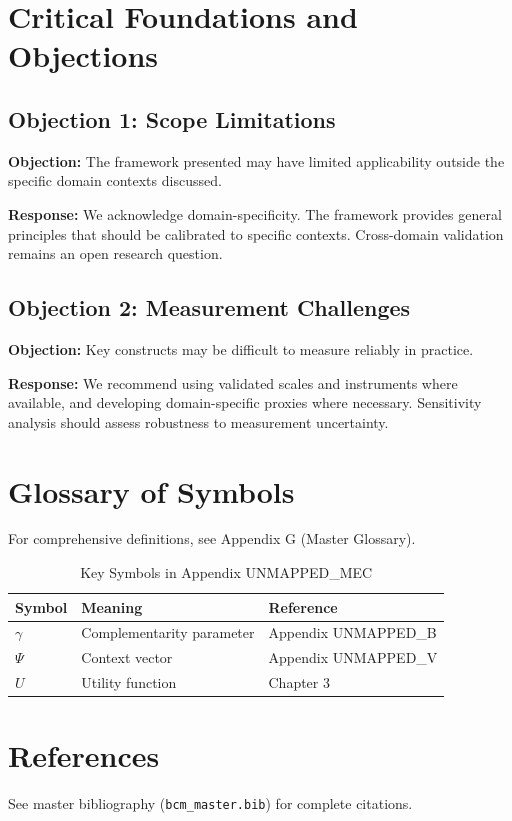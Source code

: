 
\section{Critical Foundations and Objections}
\label{sec:mec-foundations}

\subsection{Objection 1: Scope Limitations}

\textbf{Objection:} The framework presented may have limited applicability
outside the specific domain contexts discussed.

\textbf{Response:} We acknowledge domain-specificity. The framework provides
general principles that should be calibrated to specific contexts. Cross-domain
validation remains an open research question.

\subsection{Objection 2: Measurement Challenges}

\textbf{Objection:} Key constructs may be difficult to measure reliably in
practice.

\textbf{Response:} We recommend using validated scales and instruments where
available, and developing domain-specific proxies where necessary. Sensitivity
analysis should assess robustness to measurement uncertainty.



\section{Glossary of Symbols}
\label{sec:mec-glossary}

For comprehensive definitions, see Appendix G (Master Glossary).

\begin{table}[htbp]
\centering
\caption{Key Symbols in Appendix UNMAPPED_MEC}
\begin{tabular}{lll}
\toprule
\textbf{Symbol} & \textbf{Meaning} & \textbf{Reference} \\
\midrule
$\gamma$ & Complementarity parameter & Appendix UNMAPPED_B \\
$\Psi$ & Context vector & Appendix UNMAPPED_V \\
$U$ & Utility function & Chapter 3 \\
\bottomrule
\end{tabular}
\end{table}


\section{References}
\label{sec:mec-references}

See master bibliography (\texttt{bcm\_master.bib}) for complete citations.

\nocite{bcm_master}

